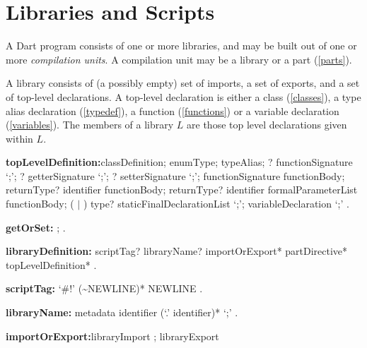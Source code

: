 \documentclass{article}
\begin{document}

\section{Libraries and Scripts}

\LMHash{}
A Dart program consists of one or more libraries, and may be built out of one or more {\em compilation units}. A compilation unit may be a library or a part (\ref{parts}). 

\LMHash{}
A library consists of (a possibly empty) set of imports, a set of exports,  and a set of top-level declarations. A top-level declaration is either a class (\ref{classes}), a type alias declaration (\ref{typedef}), a function (\ref{functions}) or a variable declaration (\ref{variables}). The members of a library $L$ are those top level declarations given within $L$.

 \begin{grammar}
{\bf topLevelDefinition:}classDefinition;
     enumType;
      typeAlias;
      \EXTERNAL{}? functionSignature `{\escapegrammar ;}';
      \EXTERNAL{}? getterSignature `{\escapegrammar ;}';
      \EXTERNAL{}? setterSignature `{\escapegrammar ;}';      
      functionSignature functionBody;
      returnType? \GET{} identifier functionBody;
      returnType? \SET{} identifier formalParameterList functionBody;
      (\FINAL{} $|$ \CONST{}) type? staticFinalDeclarationList `{\escapegrammar ;}';
      variableDeclaration `{\escapegrammar ;}'
    .
    
    {\bf getOrSet:} \GET{};
      \SET{}
    .



{\bf libraryDefinition:}
      scriptTag? libraryName? importOrExport* partDirective* topLevelDefinition*
    .
    
    {\bf     scriptTag:}
   `\#!' {\escapegrammar (\~{}NEWLINE)*} NEWLINE
 .    

{\bf libraryName:}
   metadata \LIBRARY{} identifier (`{\escapegrammar .}' identifier)* `{\escapegrammar ;}'
   .

{\bf importOrExport:}libraryImport ;
  libraryExport   
 \end{grammar}
 
\end{document}
